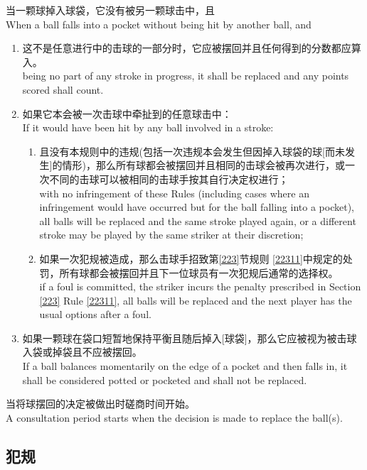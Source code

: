 \noindent 当一颗球掉入球袋，它没有被另一颗球击中，且\\
When a ball falls into a pocket without being hit by another ball, and
\begin{enumerate}[label=(\alph*)]
    \item 这不是任意进行中的击球的一部分时，它应被摆回并且任何得到的分数都应算入。\\
    being no part of any stroke in progress, it shall be replaced and any points scored shall count.
    \item 如果它本会被一次击球中牵扯到的任意球击中：\\
    If it would have been hit by any ball involved in a stroke:
    \begin{enumerate}[label=(\roman*)]
        \item 且没有本规则中的违规(包括一次违规本会发生但因掉入球袋的球[而未发生]的情形)，那么所有球都会被摆回并且相同的击球会被再次进行，或一次不同的击球可以被相同的击球手按其自行决定权进行；\\
        with no infringement of these Rules (including cases where an infringement would have occurred but for the ball falling into a pocket), all balls will be replaced and the same stroke played again, or a different stroke may be played by the same striker at their discretion;
        \item 如果一次犯规被造成，那么击球手招致第\ref{223}节规则 \ref{22311}中规定的处罚，所有球都会被摆回并且下一位球员有一次犯规后通常的选择权。\\
        if a foul is committed, the striker incurs the penalty prescribed in Section \ref{223} Rule \ref{22311}, all balls will be replaced and the next player has the usual options after a foul.
    \end{enumerate}
    \item 如果一颗球在袋口短暂地保持平衡且随后掉入[球袋]，那么它应被视为被击球入袋或掉袋且不应被摆回。\\
    If a ball balances momentarily on the edge of a pocket and then falls in, it shall be considered potted or pocketed and shall not be replaced.
\end{enumerate}
\noindent 当将球摆回的决定被做出时磋商时间开始。\\
A consultation period starts when the decision is made to replace the ball(s).

\subsection{犯规}\label{22310}

